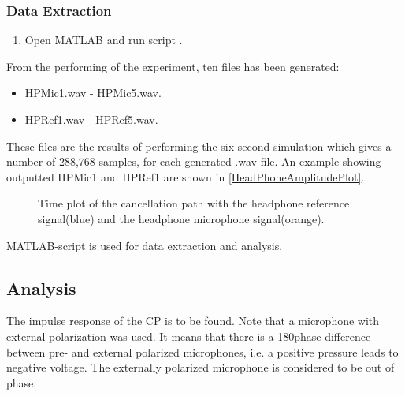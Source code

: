 \subsubsection{Data Extraction}
\begin{enumerate}
	\item Open MATLAB\textsuperscript{\textregistered} and run script .
\end{enumerate}

From the performing of the experiment, ten files has been generated:
\begin{itemize}
	\item HPMic1.wav - HPMic5.wav.
	\item HPRef1.wav - HPRef5.wav.
\end{itemize}

These files are the results of performing the six second simulation which gives a number of 288,768 samples, for each generated .wav-file.
An example showing outputted HPMic1 and HPRef1 are shown in  \autoref{HeadPhoneAmplitudePlot}.


\begin{figure}[H]
	\centering
	
	\caption{Time plot of the cancellation path with the headphone reference signal(blue) and the headphone microphone signal(orange).}
	\label{HeadPhoneAmplitudePlot}
\end{figure}

MATLAB\textsuperscript{\textregistered}-script  is used for data extraction and analysis.


\subsection{Analysis}
The impulse response of the CP is to be found.
Note that a microphone with external polarization was used. It means that there is a 180\textdegree phase difference between pre- and external polarized microphones, i.e. a positive pressure leads to negative voltage. The externally polarized microphone is considered to be out of phase. \cite{michandbook}

